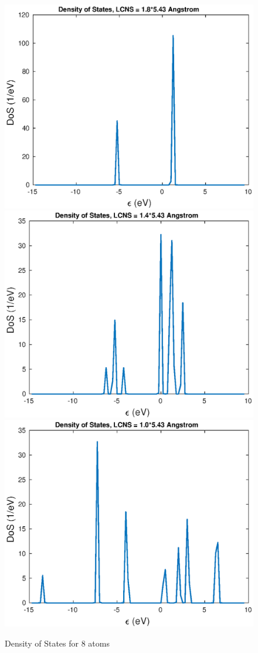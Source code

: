 \documentclass[11pt, oneside]{article}   	%
\begin{document}
	\begin{figure}[!htbp]
	\centering
	\includegraphics[scale=0.55]{dos_1pt8.eps}
	\includegraphics[scale=0.55]{dos_1pt4.eps}
	\includegraphics[scale=0.55]{dos_1pt0.eps}
	\caption{Density of States for 8 atoms}
	\end{figure}
\end{document}
